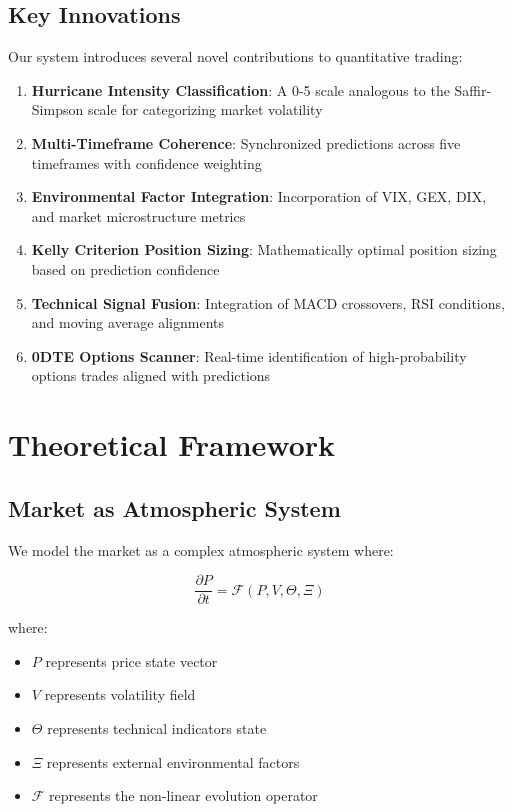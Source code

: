 \documentclass[12pt,a4paper]{article}
\begin{document}
\subsection{Key Innovations}

Our system introduces several novel contributions to quantitative trading:

\begin{enumerate}
    \item \textbf{Hurricane Intensity Classification}: A 0-5 scale analogous to the Saffir-Simpson scale for categorizing market volatility
    \item \textbf{Multi-Timeframe Coherence}: Synchronized predictions across five timeframes with confidence weighting
    \item \textbf{Environmental Factor Integration}: Incorporation of VIX, GEX, DIX, and market microstructure metrics
    \item \textbf{Kelly Criterion Position Sizing}: Mathematically optimal position sizing based on prediction confidence
    \item \textbf{Technical Signal Fusion}: Integration of MACD crossovers, RSI conditions, and moving average alignments
    \item \textbf{0DTE Options Scanner}: Real-time identification of high-probability options trades aligned with predictions
\end{enumerate}

\section{Theoretical Framework}

\subsection{Market as Atmospheric System}

We model the market as a complex atmospheric system where:

\begin{equation}
\frac{\partial P}{\partial t} = \mathcal{F}(P, V, \Theta, \Xi)
\end{equation}

where:
\begin{itemize}
    \item $P$ represents price state vector
    \item $V$ represents volatility field
    \item $\Theta$ represents technical indicators state
    \item $\Xi$ represents external environmental factors
    \item $\mathcal{F}$ represents the non-linear evolution operator
\end{itemize}
\end{document}
